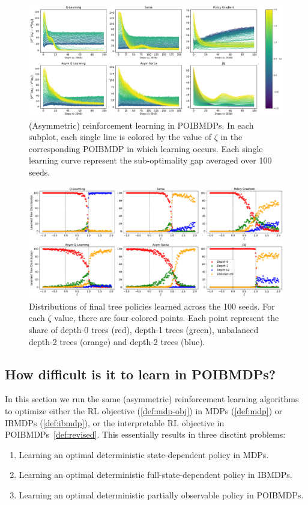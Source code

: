 \begin{figure}
    \centering
    \includegraphics[width=1\textwidth]{images/images_part1/learning_curves.pdf}
    \caption{(Asymmetric) reinforcement learning in POIBMDPs. 
    In each subplot, each single line is colored by the value of $\zeta$ in the corresponding POIBMDP in which learning occurs. 
    Each single learning curve represent the sub-optimality gap averaged over 100 seeds.
    }\label{fig:rl-poibmdp}
\end{figure}

\begin{figure}
    \centering
    \includegraphics[width=1\textwidth]{images/images_part1/tree_distributions.pdf}
    \caption{Distributions of final tree policies learned across the 100 seeds.
    For each $\zeta$ value, there are four colored points. Each point represent the share of depth-0 trees (red), depth-1 trees (green), unbalanced depth-2 trees (orange) and depth-2 trees (blue).
    }\label{fig:dt-distrib-poibmdp}
\end{figure}


\subsection{How difficult is it to learn in POIBMDPs?}

In this section we run the same (asymmetric) reinforcement learning algorithms to optimize either the RL objective (\ref{def:mdp-obj}) in MDPs (\ref{def:mdp}) or IBMDPs (\ref{def:ibmdp}), or the interpretable RL objective in POIBMDPs~\ref{def:revised}.
This essentially results in three disctint problems:
\begin{enumerate}
    \item Learning an optimal deterministic state-dependent policy in MDPs.
    \item Learning an optimal deterministic full-state-dependent policy in IBMDPs.
    \item Learning an optimal deterministic partially observable policy in POIBMDPs.
\end{enumerate}

